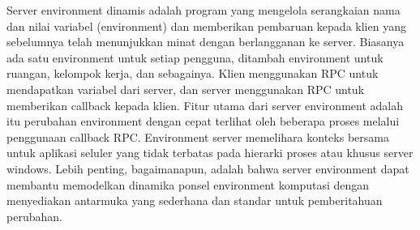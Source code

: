Server environment dinamis adalah program yang mengelola serangkaian nama dan nilai variabel (environment) dan memberikan pembaruan kepada klien yang sebelumnya telah menunjukkan minat dengan berlangganan ke server. Biasanya ada satu environment untuk setiap pengguna, ditambah environment untuk ruangan, kelompok kerja, dan sebagainya. Klien menggunakan RPC untuk mendapatkan variabel dari server, dan server menggunakan RPC untuk memberikan callback kepada klien. Fitur utama dari server environment adalah itu perubahan environment dengan cepat terlihat oleh beberapa proses melalui penggunaan callback RPC. Environment server memelihara konteks bersama untuk aplikasi seluler yang tidak terbatas pada hierarki proses atau khusus server windows. Lebih penting, bagaimanapun, adalah bahwa server environment dapat membantu memodelkan dinamika ponsel environment komputasi dengan menyediakan antarmuka yang sederhana dan standar untuk pemberitahuan perubahan. \cite{schilit1993customizing}









